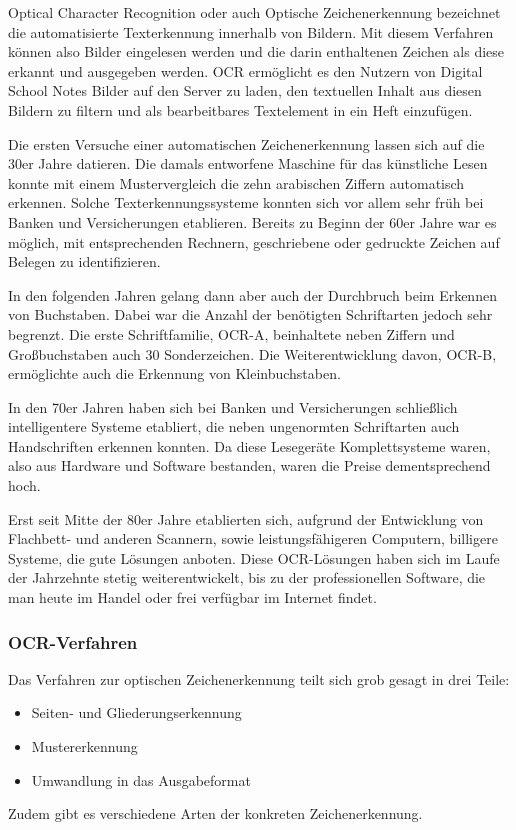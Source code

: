 Optical Character Recognition oder auch Optische Zeichenerkennung bezeichnet die automatisierte Texterkennung innerhalb von Bildern. Mit diesem Verfahren können also Bilder eingelesen werden und die darin enthaltenen Zeichen als diese erkannt und ausgegeben werden. OCR ermöglicht es den Nutzern von Digital School Notes Bilder auf den Server zu laden, den textuellen Inhalt aus diesen Bildern zu filtern und als bearbeitbares Textelement in ein Heft einzufügen.


Die ersten Versuche einer automatischen Zeichenerkennung lassen sich auf die 30er Jahre datieren. Die damals entworfene Maschine für das künstliche Lesen konnte mit einem Mustervergleich die zehn arabischen Ziffern automatisch erkennen. Solche Texterkennungssysteme konnten sich vor allem sehr früh bei Banken und Versicherungen etablieren. Bereits zu Beginn der 60er Jahre war es möglich, mit entsprechenden Rechnern, geschriebene oder gedruckte Zeichen auf Belegen zu identifizieren.

In den folgenden Jahren gelang dann aber auch der Durchbruch beim Erkennen von Buchstaben. Dabei war die Anzahl der benötigten Schriftarten jedoch sehr begrenzt. Die erste Schriftfamilie, OCR-A, beinhaltete neben Ziffern und Großbuchstaben auch 30 Sonderzeichen. Die Weiterentwicklung davon, OCR-B, ermöglichte auch die Erkennung von Kleinbuchstaben.

In den 70er Jahren haben sich bei Banken und Versicherungen schließlich intelligentere Systeme etabliert, die neben ungenormten Schriftarten auch Handschriften erkennen konnten. Da diese Lesegeräte Komplettsysteme waren, also aus Hardware und Software bestanden, waren die Preise dementsprechend hoch.

Erst seit Mitte der 80er Jahre etablierten sich, aufgrund der Entwicklung von Flachbett- und anderen Scannern, sowie leistungsfähigeren Computern, billigere Systeme, die gute Lösungen anboten. Diese OCR-Lösungen haben sich im Laufe der Jahrzehnte stetig weiterentwickelt, bis zu der professionellen Software, die man heute im Handel oder frei verfügbar im Internet findet.

\subsubsection{OCR-Verfahren}
Das Verfahren zur optischen Zeichenerkennung teilt sich grob gesagt in drei Teile:
\begin{itemize}
\item Seiten- und Gliederungserkennung
\item Mustererkennung
\item Umwandlung in das Ausgabeformat
\end{itemize}
Zudem gibt es verschiedene Arten der konkreten Zeichenerkennung.

